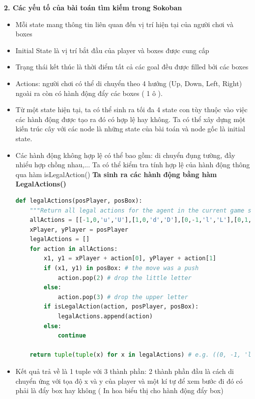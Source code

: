 \documentclass[12pt]{article}
\begin{document}
\hspace{-1em}\textbf{2. Các yếu tố của bài toán tìm kiếm trong Sokoban}
\begin{itemize}
	\lstset{style=mystyle}
	\item Mỗi state mang thông tin liên quan đến vị trí hiện tại của người chơi và boxes
	\item Initial State là vị trí bắt đầu của player và boxes được cung cấp
	\item Trạng thái kết thúc là thời điểm tất cả các goal đều được filled bởi các boxes
	\item Actions: người chơi có thể di chuyển theo 4 hướng (Up, Down, Left, Right) ngoài ra còn có hành động đẩy các boxes ( 1 ô ). 
	\item Từ một state hiện tại, ta có thể sinh ra tối đa 4 state con tùy thuộc vào việc các hành động được tạo ra đó có hợp lệ hay không. Ta có thể xây dựng một kiến trúc cây với các node là những state của bài toán và node gốc là initial state.
	\item Các hành động không hợp lệ có thể bao gồm: di chuyển đụng tường, đầy nhiểu hợp chồng nhau,... Ta có thể kiểm tra tính hợp lệ của hành động thông qua hàm isLegalAction()
	\newpage
	\noindent \hspace*{-1em}\textbf{
		Ta sinh ra các hành
động bằng hàm LegalActions()}
	\begin{tcolorbox}[boxrule=0.5pt, colback=white]
		\begin{lstlisting}[language=python, numbers=none, basicstyle=\ttfamily\footnotesize]		
def legalActions(posPlayer, posBox):
	"""Return all legal actions for the agent in the current game state"""
	allActions = [[-1,0,'u','U'],[1,0,'d','D'],[0,-1,'l','L'],[0,1,'r','R']]
	xPlayer, yPlayer = posPlayer
	legalActions = []
	for action in allActions:
		x1, y1 = xPlayer + action[0], yPlayer + action[1]
		if (x1, y1) in posBox: # the move was a push
			action.pop(2) # drop the little letter
		else:
			action.pop(3) # drop the upper letter
		if isLegalAction(action, posPlayer, posBox):
			legalActions.append(action)
		else: 
			continue     

	return tuple(tuple(x) for x in legalActions) # e.g. ((0, -1, 'l'), (0, 1, 'R'))
		\end{lstlisting}
		\end{tcolorbox}
	\item Kết quả trả về là 1 tuple	với 3 thành phần: 2 thành phần đầu là cách di chuyển ứng với tọa độ x và y của player và một
	kí tự để xem bước đi đó có phải là đẩy box hay không ( In hoa biểu thị cho hành động đẩy box)


\end{itemize}
\end{document}
